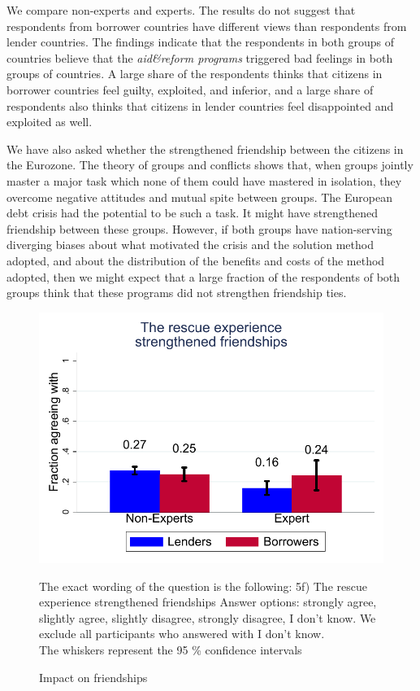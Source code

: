 We compare non-experts and experts. The results do not suggest that respondents from borrower countries have different views than respondents from lender countries. The findings indicate that the respondents
in both groups of countries believe that the \textit{aid\&reform programs} triggered
bad feelings in both groups of countries. A large share of the respondents
thinks that citizens in borrower countries feel guilty, exploited, and
inferior, and a large share of respondents also thinks that citizens in
lender countries feel disappointed and exploited as well. 

We have also asked whether the  strengthened friendship between the citizens in the Eurozone. The theory of groups and conflicts shows that, when groups jointly master a major task which none of them could have mastered in isolation, they overcome negative attitudes and mutual spite between groups. The European debt crisis had the potential to be 
such a task. It might have strengthened friendship between these groups.
However, if both groups have nation-serving diverging biases about what
motivated the crisis and the solution method adopted, and about the
distribution of the benefits and costs of the method adopted, then we might
expect that a large fraction of the respondents of both groups think that
these programs did not strengthen friendship ties. 
\begin{figure}
\begin{center}
\caption{Impact on friendships}
\includegraphics[scale=0.5]{graph5_3.pdf}
\label{fig:figure5}
\end{center}
\tiny 
\begin{tablenotes}
  {The exact wording of the question is the following: 5f) The rescue experience strengthened friendships
   Answer options: strongly agree, slightly agree, slightly disagree, strongly disagree, I don't know. We exclude all participants who answered with I don't know. \\
     The whiskers represent the 95 \% confidence intervals}
    \end{tablenotes}
\end{figure}

